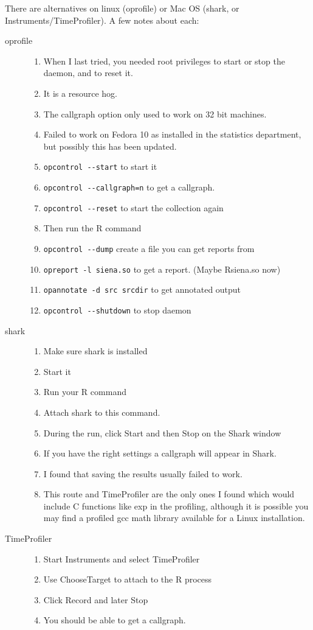 \documentclass[12pt, a4paper]{article}
\renewcommand{\=}{\,=\,}
\newcommand{\+}{\,+\,}
\begin{document}
There are alternatives on linux (\textsf{oprofile}) or Mac OS (\textsf{shark},
or
\textsf{Instruments/TimeProfiler}).
A few notes about each:
\begin{description}
\item[oprofile]
\begin{enumerate}
\item When I last tried, you needed root privileges to start or stop the daemon,
  and to reset it.
\item It is a resource hog.
\item The callgraph option only used to work on 32 bit machines.
\item Failed to work on Fedora 10 as installed in the statistics department, but
  possibly this has been updated.
\item \verb|opcontrol --start| to start it
\item \verb|opcontrol --callgraph=n| to get a callgraph.
\item \verb|opcontrol --reset| to start the collection again
\item Then run the R command
\item \verb|opcontrol --dump| create a file you can get reports from
\item \verb|opreport -l siena.so| to get a report. (Maybe Rsiena.so now)
\item \verb|opannotate -d src srcdir| to get annotated output
\item \verb|opcontrol --shutdown| to stop daemon
\end{enumerate}
\item[shark]
\begin{enumerate}
\item Make sure shark is installed
\item Start it
\item Run your R command
\item Attach shark to this command.
\item During the run, click Start and then Stop  on the Shark window
\item If you have the right settings a callgraph will appear in Shark.
\item I found that saving the results usually failed to work.
\item This route and TimeProfiler are the only ones I found which would include
  C functions like exp in the profiling, although it is possible you may find a
  profiled gcc math library available for a Linux installation.
\end{enumerate}
\item[TimeProfiler]
\begin{enumerate}
\item Start Instruments and select TimeProfiler
\item Use ChooseTarget to attach to the R process
\item Click Record and later Stop
\item You should be able to get a callgraph.
\end{enumerate}
\end{description}
\end{document}

